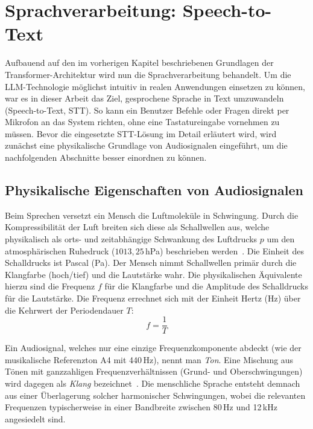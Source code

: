 
\chapter{Sprachverarbeitung: Speech-to-Text}
\label{sec:sprachverarbeitung}

Aufbauend auf den im vorherigen Kapitel beschriebenen Grundlagen der Transformer-Architektur wird nun die Sprachverarbeitung behandelt. Um die LLM-Technologie möglichst intuitiv in realen Anwendungen einsetzen zu können, war es in dieser Arbeit das Ziel, gesprochene Sprache in Text umzuwandeln (Speech-to-Text, STT). So kann ein Benutzer Befehle oder Fragen direkt per Mikrofon an das System richten, ohne eine Tastatureingabe vornehmen zu müssen. Bevor die eingesetzte STT-Lösung im Detail erläutert wird, wird zunächst eine physikalische Grundlage von Audiosignalen eingeführt, um die nachfolgenden Abschnitte besser einordnen zu können.

\section{Physikalische Eigenschaften von Audiosignalen}

Beim Sprechen versetzt ein Mensch die Luftmoleküle in Schwingung. Durch die Kompressibilität der Luft breiten sich diese als Schallwellen aus, welche physikalisch als orts- und zeitabhängige Schwankung des Luftdrucks $p$ um den atmosphärischen Ruhedruck ($1013,25$\,hPa) beschrieben werden~\cite{Moeser2015}. Die Einheit des Schalldrucks ist Pascal (Pa).
Der Mensch nimmt Schallwellen primär durch die Klangfarbe (hoch/tief) und die Lautstärke wahr. Die physikalischen Äquivalente hierzu sind die Frequenz $f$ für die Klangfarbe und die Amplitude des Schalldrucks für die Lautstärke. Die Frequenz errechnet sich mit der Einheit Hertz (Hz) über die Kehrwert der Periodendauer $T$:
\begin{equation}
    f = \frac{1}{T}
    \label{eq:frequenz}
\end{equation}

Ein Audiosignal, welches nur eine einzige Frequenzkomponente abdeckt (wie der musikalische Referenzton A4 mit 440\,Hz), nennt man \textit{Ton}. Eine Mischung aus Tönen mit ganzzahligen Frequenzverhältnissen (Grund- und Oberschwingungen) wird dagegen als \textit{Klang} bezeichnet~\cite{Mueller2015}. Die menschliche Sprache entsteht demnach aus einer Überlagerung solcher harmonischer Schwingungen, wobei die relevanten Frequenzen typischerweise in einer Bandbreite zwischen 80\,Hz und 12\,kHz angesiedelt sind.

